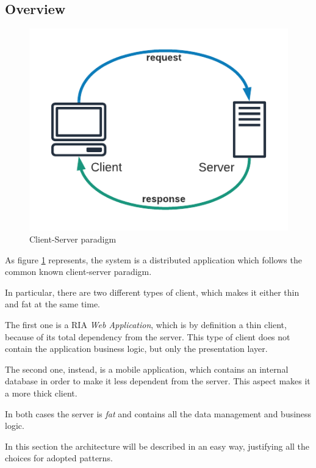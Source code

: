 \documentclass[table, 12pt]{article}
\begin{document}
\subsection{Overview}
\begin{figure}[H]
    \begin{center}
        \includegraphics[width=\textwidth/2]{assets/Architectural-Design/Client-Server.png}
        \caption{Client-Server paradigm}\label{client_server_par}
    \end{center}
\end{figure}

As figure \ref{client_server_par} represents, the system is a distributed application which follows the common known client-server paradigm.

In particular, there are two different types of client, which makes it either thin and fat at the same time.

The first one is a RIA \textit{Web Application}, which is by definition a thin client, because of its total dependency from the server.
This type of client does not contain the application business logic, but only the presentation layer.

The second one, instead, is a mobile application, which contains an internal database in order to make it less dependent from the server. This aspect makes it a more thick client.

In both cases the server is \textit{fat} and contains all the data management and business logic.

In this section the architecture will be described in an easy way, justifying all the choices for adopted patterns.
\end{document}
